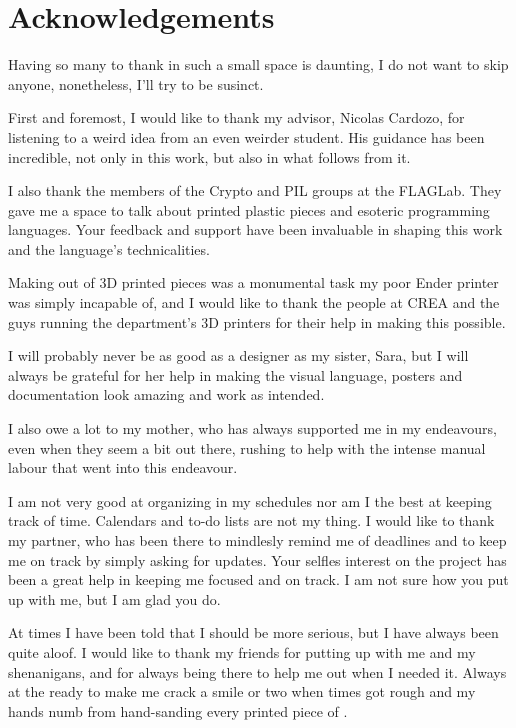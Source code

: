 
\chapter{Acknowledgements}

Having so many to thank in such a small space is daunting, I do not want to skip anyone, nonetheless, I'll try to be susinct.

First and foremost, I would like to thank my advisor, Nicolas Cardozo, for listening to a weird idea from an even weirder student.
His guidance has been incredible, not only in this work, but also in what follows from it.

I also thank the members of the Crypto and PIL groups at the FLAGLab. They gave me a space to talk about printed plastic pieces and
esoteric programming languages. Your feedback and support have been invaluable in shaping this work and the language's technicalities.

Making \sculpt out of 3D printed pieces was a monumental task my poor Ender printer was simply incapable of, and I would like to thank the people at CREA and the guys running the department's 3D printers for their help in making this possible.

I will probably never be as good as a designer as my sister, Sara, but I will always be grateful for
her help in making the \sculpt visual language, posters and documentation look amazing and work as intended.

I also owe a lot to my mother, who has always supported me in my endeavours, even when they seem a bit out there, rushing to help with the intense manual labour that went into this endeavour.

I am not very good at organizing in my schedules nor am I the best at keeping track of time. Calendars and to-do lists are not my thing.
I would like to thank my partner, who has been there to mindlesly remind me of deadlines and to keep me on track by simply asking for updates.
Your selfles interest on the project has been a great help in keeping me focused and on track.
I am not sure how you put up with me, but I am glad you do.

At times I have been told that I should be more serious, but I have always been quite aloof.
I would like to thank my friends for putting up with me and my shenanigans, and for always being there to help me out when I needed it.
Always at the ready to make me crack a smile or two when times got rough and my hands numb from hand-sanding every printed piece of \sculpt.

